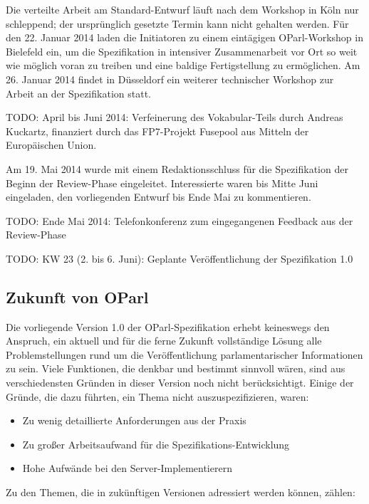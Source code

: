 \documentclass[,a4paper]{article}
\begin{document}
Die verteilte Arbeit am Standard-Entwurf läuft nach dem Workshop in Köln
nur schleppend; der ursprünglich gesetzte Termin kann nicht gehalten
werden. Für den 22. Januar 2014 laden die Initiatoren zu einem
eintägigen OParl-Workshop in Bielefeld ein, um die Spezifikation in
intensiver Zusammenarbeit vor Ort so weit wie möglich voran zu treiben
und eine baldige Fertigstellung zu ermöglichen. Am 26. Januar 2014
findet in Düsseldorf ein weiterer technischer Workshop zur Arbeit an der
Spezifikation statt.

TODO: April bis Juni 2014: Verfeinerung des Vokabular-Teils durch
Andreas Kuckartz, finanziert durch das FP7-Projekt Fusepool aus Mitteln
der Europäischen Union.

Am 19. Mai 2014 wurde mit einem Redaktionsschluss für die Spezifikation
der Beginn der Review-Phase eingeleitet. Interessierte waren bis Mitte
Juni eingeladen, den vorliegenden Entwurf bis Ende Mai zu kommentieren.

TODO: Ende Mai 2014: Telefonkonferenz zum eingegangenen Feedback aus der
Review-Phase

TODO: KW 23 (2. bis 6. Juni): Geplante Veröffentlichung der
Spezifikation 1.0

\subsection{Zukunft von OParl}\label{zukunft-von-oparl}

Die vorliegende Version 1.0 der OParl-Spezifikation erhebt keineswegs
den Anspruch, ein aktuell und für die ferne Zukunft vollständige Lösung
alle Problemstellungen rund um die Veröffentlichung parlamentarischer
Informationen zu sein. Viele Funktionen, die denkbar und bestimmt
sinnvoll wären, sind aus verschiedensten Gründen in dieser Version noch
nicht berücksichtigt. Einige der Gründe, die dazu führten, ein Thema
nicht auszuspezifizieren, waren:

\begin{itemize}
\itemsep1pt\parskip0pt
\item
  Zu wenig detaillierte Anforderungen aus der Praxis
\item
  Zu großer Arbeitsaufwand für die Spezifikations-Entwicklung
\item
  Hohe Aufwände bei den Server-Implementierern
\end{itemize}

Zu den Themen, die in zukünftigen Versionen adressiert werden können,
zählen:
\end{document}
